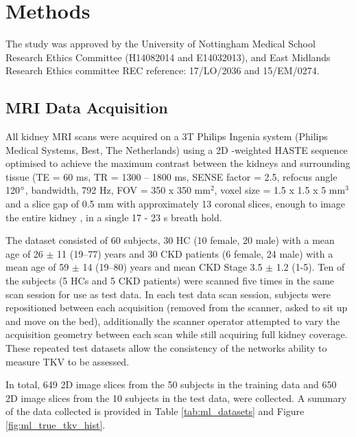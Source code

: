 \newpage
\section{Methods}
The study was approved by the University of Nottingham Medical School Research Ethics Committee (H14082014 and E14032013), and East Midlands Research Ethics committee REC reference: 17/LO/2036 and 15/EM/0274.

\subsection{MRI Data Acquisition}
\label{sec:ml_methods_acquisition}

All kidney \ac{MRI} scans were acquired on a 3T Philips Ingenia system (Philips Medical Systems, Best, The Netherlands) using a 2D \ttwo-weighted \ac{HASTE} sequence optimised to achieve the maximum contrast between the kidneys and surrounding tissue (\ac{TE} = 60 ms, \ac{TR} = 1300 – 1800 ms, \ac{SENSE} factor = 2.5, refocus angle 120$\degree$, bandwidth, 792 Hz, \ac{FOV} = 350 x 350 mm$^2$, voxel size = 1.5 x 1.5 x 5 mm$^3$ and a slice gap of 0.5 mm with approximately 13 coronal slices, enough to image the entire kidney \cite{petzold_building_2014, will_automated_2014}, in a single 17 - 23 s breath hold.

The dataset consisted of 60 subjects, 30 \ac{HC} (10 female, 20 male) with a mean age of 26 $\pm$ 11 (19–77) years and 30 \ac{CKD} patients (6 female, 24 male) with a mean age of 59 $\pm$ 14 (19–80) years and mean \ac{CKD} Stage 3.5 $\pm$ 1.2 (1-5). Ten of the subjects (5 \ac{HC}s and 5 \ac{CKD} patients) were scanned five times in the same scan session for use as test data. In each test data scan session, subjects were repositioned between each acquisition (removed from the scanner, asked to sit up and move on the bed), additionally the scanner operator attempted to vary the acquisition geometry between each scan while still acquiring full kidney coverage. These repeated test datasets allow the consistency of the networks ability to measure \ac{TKV} to be assessed. 

In total, 649 2D image slices from the 50 subjects in the training data and 650 2D image slices from the 10 subjects in the test data, were collected. A summary of the data collected is provided in Table \ref{tab:ml_datasets} and Figure \ref{fig:ml_true_tkv_hist}.

